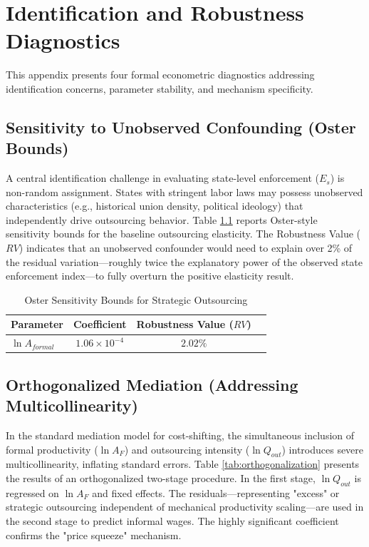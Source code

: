\chapter{Identification and Robustness Diagnostics}
\label{appendixD}

This appendix presents four formal econometric diagnostics addressing identification concerns, parameter stability, and mechanism specificity.

\section{Sensitivity to Unobserved Confounding (Oster Bounds)}

A central identification challenge in evaluating state-level enforcement ($E_s$) is non-random assignment. States with stringent labor laws may possess unobserved characteristics (e.g., historical union density, political ideology) that independently drive outsourcing behavior. Table \ref{tab:oster_bounds} reports Oster-style sensitivity bounds \autocite{Oster2019} for the baseline outsourcing elasticity. The Robustness Value ($RV$) indicates that an unobserved confounder would need to explain over 2\% of the residual variation—roughly twice the explanatory power of the observed state enforcement index—to fully overturn the positive elasticity result. 

\begin{table}[H]
	\centering
	\caption{Oster Sensitivity Bounds for Strategic Outsourcing}
	\label{tab:oster_bounds}
	\begin{tabular}{lccc}
		\toprule
		Parameter & Coefficient & Robustness Value ($RV$) \\
		\midrule
		$\ln A_{formal}$ & $1.06 \times 10^{-4}$ & $2.02\%$ \\
		\bottomrule
	\end{tabular}
\end{table}

\section{Orthogonalized Mediation (Addressing Multicollinearity)}

In the standard mediation model for cost-shifting, the simultaneous inclusion of formal productivity ($\ln A_{F}$) and outsourcing intensity ($\ln Q_{out}$) introduces severe multicollinearity, inflating standard errors. Table \ref{tab:orthogonalization} presents the results of an orthogonalized two-stage procedure. In the first stage, $\ln Q_{out}$ is regressed on $\ln A_{F}$ and fixed effects. The residuals—representing "excess" or strategic outsourcing independent of mechanical productivity scaling—are used in the second stage to predict informal wages. The highly significant coefficient confirms the "price squeeze" mechanism.

